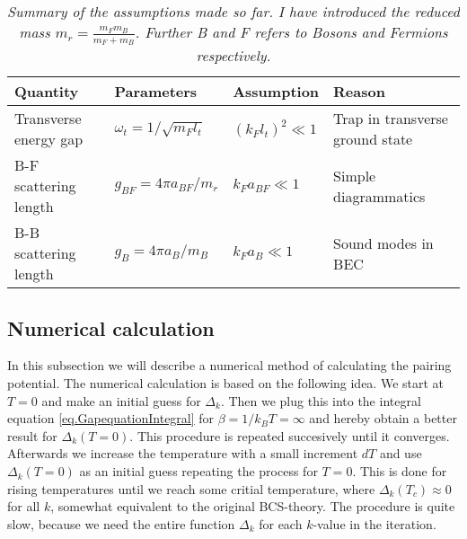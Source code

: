 \begin{table}[htb]
\centering
\caption{\textit{Summary of the assumptions made so far. I have introduced the reduced mass $m_r = \frac{m_Fm_B}{m_F+m_B}$. Further B and F refers to Bosons and Fermions respectively.}}
\begin{tabular}{|l|l|l|l|}
\hline \textbf{Quantity} & \textbf{Parameters} & \textbf{Assumption}			& \textbf{Reason}	\\
\hline Transverse energy gap & $\omega_t = 1/\sqrt{m_Fl_t}$ & $(k_Fl_t)^2\ll 1$ & Trap in transverse ground state \\
\hline B-F scattering length& $g_{BF} = 4\pi a_{BF}/m_r$ 	& $k_Fa_{BF} \ll 1$	& Simple diagrammatics\\
\hline B-B scattering length  & $g_B = 4\pi a_B/m_B$			& $k_Fa_B 	 \ll 1$	& Sound modes in BEC  \\
\hline 
\end{tabular}
\label{tab.assumptions}
\end{table}


\subsection{Numerical calculation} \label{subsec.pairing.numerical}
In this subsection we will describe a numerical method of calculating the pairing potential. The numerical calculation is based on the following idea. We start at $T=0$ and make an initial guess for $\Delta_k$. Then we plug this into the integral equation \eqref{eq.GapequationIntegral} for $\beta = 1/k_BT = \infty$ and hereby obtain a better result for $\Delta_k(T=0)$. This procedure is repeated succesively until it converges. Afterwards we increase the temperature with a small increment $dT$ and use $\Delta_k(T=0)$ as an initial guess repeating the process for $T=0$. This is done for rising temperatures until we reach some critial temperature, where $\Delta_k(T_c)\approx 0$ for all $k$, somewhat equivalent to the original BCS-theory\cite{Tinkham,LandauStatPhys2,PlischkeStatPhys}. The procedure is quite slow, because we need the entire function $\Delta_k$ for each $k$-value in the iteration. 

